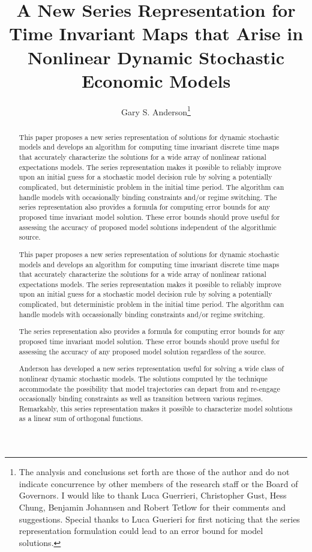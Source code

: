 \documentclass[12pt]{article}
\author{Gary S. Anderson\thanks{The analysis and conclusions set forth are those of the author and do not indicate concurrence by other members of the research staff or the Board of Governors. I would like to thank Luca Guerrieri, Christopher Gust, Hess Chung, Benjamin Johannsen  and Robert Tetlow for their comments and suggestions.  Special thanks to Luca Guerieri for first noticing that the series representation formulation could lead to an error bound for model solutions.}}
\title{A New Series Representation for Time Invariant Maps that
 Arise in  Nonlinear Dynamic Stochastic Economic Models}
\begin{document}
\maketitle

\begin{abstract}
This paper proposes a new series representation of solutions
for dynamic stochastic models and develops an algorithm for computing
 time invariant discrete time maps that accurately characterize
the solutions for a wide array of nonlinear rational expectations models. 
The series representation makes it possible to reliably improve upon an initial
guess for a stochastic model decision rule by solving a 
potentially complicated, but deterministic problem in the initial time period.
The algorithm can handle models with occasionally binding constraints and/or regime switching. 
\newpage
\tableofcontents
\newpage
The series representation also provides a formula for computing 
error bounds for any proposed time invariant model solution.
These error bounds should prove useful for assessing the accuracy of 
proposed model solutions independent of the algorithmic source.




This paper proposes a new series representation of solutions
for dynamic stochastic models and develops an algorithm for computing
 time invariant discrete time maps that accurately characterize
the solutions for a wide array of nonlinear rational expectations models. 
The series representation makes it possible to reliably improve upon an initial
guess for a stochastic model decision rule by solving a 
potentially complicated, but deterministic problem in the initial time period.
The algorithm can handle models with 
occassionally binding constraints and/or regime switching. 


The series representation also provides a formula for computing 
error bounds for any proposed time invariant model solution.
These error bounds should prove useful for assessing the accuracy of any
proposed model solution regardless of the source.



Anderson has developed a new series representation useful for
solving a wide class of nonlinear dynamic stochastic models.
The solutions computed by the technique accommodate the possibility that 
model trajectories can depart from and re-engage
occasionally binding constraints as well as transition between various regimes. Remarkably, this series representation makes it possible to characterize model solutions as a linear sum of orthogonal functions.  




\end{abstract}
\end{document}
